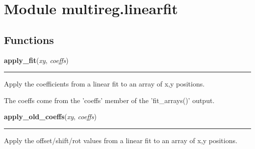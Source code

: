 %
%
%


\section{Module multireg.linearfit}

    \label{multireg:linearfit}


  \subsection{Functions}

    \label{multireg:linearfit:apply_fit}
    \vspace{0.5ex}

    \begin{boxedminipage}{\textwidth}

    \raggedright \textbf{apply\_fit}(\textit{xy}, \textit{coeffs})

    \vspace{-1.5ex}

    \rule{\textwidth}{0.5\fboxrule}
    Apply the coefficients from a linear fit to an array of x,y 
    positions.

    The coeffs come from the 'coeffs' member of the 'fit\_arrays()' 
    output.

    \vspace{1ex}

    \end{boxedminipage}

    \label{multireg:linearfit:apply_old_coeffs}
    \vspace{0.5ex}

    \begin{boxedminipage}{\textwidth}

    \raggedright \textbf{apply\_old\_coeffs}(\textit{xy}, \textit{coeffs})

    \vspace{-1.5ex}

    \rule{\textwidth}{0.5\fboxrule}
    Apply the offset/shift/rot values from a linear fit to an array of 
    x,y positions.

    \vspace{1ex}

    \end{boxedminipage}

